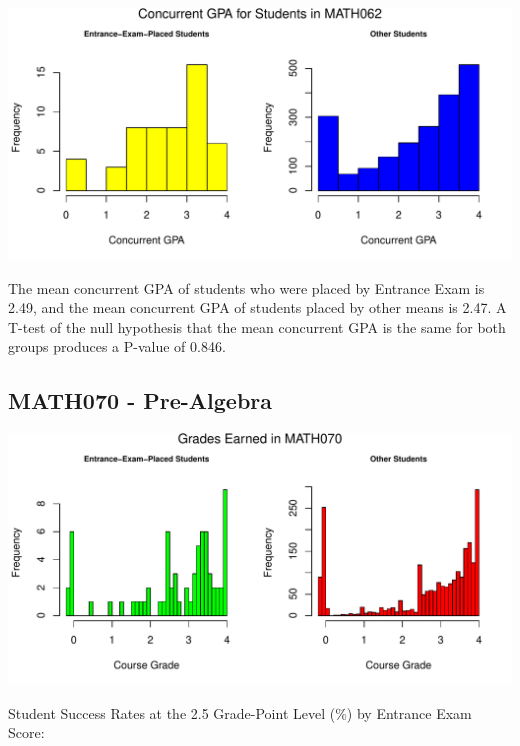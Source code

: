 \documentclass[twoside]{article}\usepackage[]{graphicx}\usepackage[]{color}
\makeatletter
\def\maxwidth{ %
  \ifdim\Gin@nat@width>\linewidth
    \linewidth
  \else
    \Gin@nat@width
  \fi
}
\newenvironment{knitrout}{}{} %
\makeatother
\begin{document}
\begin{knitrout}
\color{fgcolor}
\includegraphics[width=\maxwidth]{figure/GPAgraphs062-1} 

\end{knitrout}

The mean concurrent GPA of students who were placed by Entrance Exam is 2.49, and the mean concurrent GPA of students placed by other means is 2.47.  A T-test of the null hypothesis that the mean concurrent GPA is the same for both groups produces a P-value of 0.846.

\newpage
\subsection{MATH070 - Pre-Algebra}

\begin{knitrout}
\color{fgcolor}
\includegraphics[width=\maxwidth]{figure/graphs070-1} 

\end{knitrout}


Student Success Rates  at the 2.5 Grade-Point Level (\%) by Entrance Exam Score:
\end{document}
